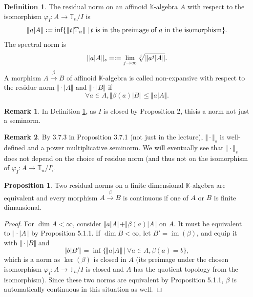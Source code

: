 \documentclass[10pt]{article}
\numberwithin{equation}{section}
\theoremstyle{definition}
\newtheorem{proposition}{Proposition}[subsection]
\newtheorem{definition}{Definition}[subsection]
\newtheorem{remark}{Remark}[subsection]
\DeclareMathOperator{\image}{im}
\newcommand{\defeq}{\vcentcolon=}
\newcommand{\norm}[1]{\Vert #1 \Vert}
\newcommand{\T}[0]{\mathbb{T}}
\newcommand{\K}[0]{\mathbb{K}}
\newcommand{\sep}[0]{\:|\:}
\begin{document}
\begin{definition}
    \label{definition_31_4}
    The residual norm on an affinoid $\K$-algebra $A$ with respect to the isomorphism $\varphi_I:A\to\T_n/I$ is 
    \begin{equation*}
        \norm{a|A}\defeq\inf\{\norm{t|\T_n}\sep \text{$t$ is in the preimage of $a$ in the isomorphism}\}.
    \end{equation*}
    The spectral norm is 
    \begin{equation*}
        \norm{a|A}_s=\defeq \lim_{j\to\infty}\sqrt[j]{\norm{a^j|A}}.
    \end{equation*}
    A morphism $A\stackrel{\beta}{\to}B$ of affinoid $\K$-algebra is called non-expansive with respect to the residue norm $\norm{\cdot|A}$ and $\norm{\cdot|B}$ if 
    \begin{equation*}
        \forall a\in A,\norm{\beta(a)|B}\leq\norm{a|A}.
    \end{equation*}
\end{definition}
\begin{remark}
    In Definition \ref{definition_31_4}, as $I$ is closed by Proposition 2, thisis a norm not just a seminorm.
\end{remark}

\begin{remark}
    By 3.7.3 in Proposition 3.7.1 (not just in the lecture), $\norm{\cdot}_s$ is well-defined and a power multiplicative seminorm. We will eventually see that $\norm{\cdot}_s$ does not depend on the choice of residue norm (and thus not on the isomorphism of $\varphi_I:A\to \T_n/I$). 
\end{remark}

\begin{proposition}
    \label{fact_31_10}
    Two residual norms on a finite dimensional $\K$-algebra are equivalent and every morphism $A\stackrel{\beta}{\to}B$ is continuous if one of $A$ or $B$ is finite dimansional.
\end{proposition}
\begin{proof}
    For $\dim A< \infty$, consider $\norm{a|A}+\norm{\beta(a)|A}$ on $A$. It must be equivalent to $\norm{\cdot|A}$ by Proposition 5.1.1.
    If $\dim B<\infty$, let $B' = \image(\beta)$, and equip it with $\norm{\cdot|B}$ and 
    \begin{equation*}
        \norm{b|B'} = \inf\{\norm{a|A}\sep \forall a\in A, \beta(a) = b\},
    \end{equation*}
    which is a norm as $\ker(\beta)$ is closed in $A$ (its preimage under the chosen isomorphism $\varphi_I:A\to \T_n/I$ is closed and $A$ has the quotient topology from the isomorphism). Since these two norms are equivalent by Proposition 5.1.1, $\beta$ is automatically continuous in this situation as well.
\end{proof}
\end{document}
